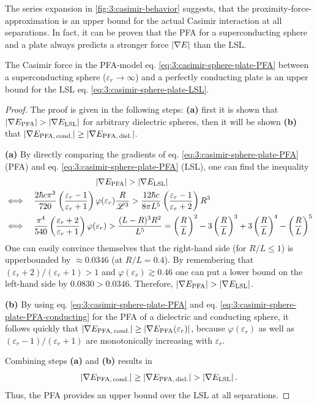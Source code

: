 The series expansion in \cref{fig:3:casimir-behavior} suggests, that the proximity-force-approximation is an upper bound for the actual Casimir interaction at all separations. In fact, it can be proven that the PFA for a superconducting sphere and a plate always predicts a stronger force $\left\lvert\nabla E\right\rvert$ than the LSL.
\begin{theorem}
  The Casimir force in the PFA-model eq. \eqref{eq:3:casimir-sphere-plate-PFA} between a superconducting sphere ($\varepsilon_r \rightarrow \infty$) and a perfectly conducting plate is an upper bound for the LSL eq. \eqref{eq:3:casimir-sphere-plate-LSL}.
\end{theorem}
\begin{proof}
  The proof is given in the following steps: \textbf{(a)} first it is shown that $\left\lvert\nabla E_\mathrm{PFA}\right\rvert > \left\lvert\nabla E_\mathrm{LSL}\right\rvert$ for arbitrary dielectric spheres, then it will be shown \textbf{(b)} that $\left\lvert\nabla E_\mathrm{PFA,\,cond.}\right\rvert \geq \left\lvert\nabla E_\mathrm{PFA,\,diel.}\right\rvert$.

  \textbf{(a)} By directly comparing the gradients of eq. \eqref{eq:3:casimir-sphere-plate-PFA} (PFA) and eq. \eqref{eq:3:casimir-sphere-plate-PFA} (LSL),  one can find
  the inequality
  \begin{align*}
    &\qquad\qquad\qquad\qquad\qquad\ \ \left\lvert\nabla E_\mathrm{PFA}\right\rvert > \left\lvert\nabla E_\mathrm{LSL}\right\rvert \\
    &\Longleftrightarrow \quad  \frac{2\hbar c \pi^3}{720}\left(\frac{\varepsilon_r - 1}{\varepsilon_r + 1}\right)\varphi(\varepsilon_r)\frac{R}{\mathscr{L}^3} > \frac{12 \hbar c}{8\pi L^5}\left(\frac{\varepsilon_r - 1}{\varepsilon_r + 2}\right)R^3 \\
    &\Longleftrightarrow \quad \frac{\pi^4}{540}\left(\frac{\varepsilon_r + 2}{\varepsilon_r + 1}\right)\varphi(\varepsilon_r) > \frac{(L-R)^3 R^2}{L^5} = \left(\frac{R}{L}\right)^2 - 3\left(\frac{R}{L}\right)^3 + 3\left(\frac{R}{L}\right)^4 - \left(\frac{R}{L}\right)^5
  \end{align*}
  One can easily convince themselves that the right-hand side (for $R/L \leq 1$) is upperbounded by $\approx 0.0346$ (at $R/L = 0.4$). By remembering that $(\varepsilon_r + 2)/(\varepsilon_r + 1) > 1$ and $\varphi(\varepsilon_r) \gtrsim 0.46$ one can put a lower bound on the left-hand side by $0.0830 > 0.0346$. Therefore, $\left\lvert\nabla E_\mathrm{PFA}\right\rvert > \left\lvert\nabla E_\mathrm{LSL}\right\rvert$.

  \textbf{(b)} By using eq. \eqref{eq:3:casimir-sphere-plate-PFA} and eq. \eqref{eq:3:casimir-sphere-plate-PFA-conducting} for the PFA of a dielectric and conducting sphere, it follows quickly that $\left\lvert\nabla E_\mathrm{PFA,\,cond.}\right\rvert \geq \left\lvert\nabla E_\mathrm{PFA}(\varepsilon_r)\right\rvert$, because $\varphi(\varepsilon_r)$ as well as $(\varepsilon_r - 1)/(\varepsilon_r + 1)$ are monotonically increasing with $\varepsilon_r$. 

  Combining steps \textbf{(a)} and \textbf{(b)} results in
  \begin{equation}
    \left\lvert\nabla E_\mathrm{PFA,\,cond.}\right\rvert \geq \left\lvert\nabla E_\mathrm{PFA,\,diel.}\right\rvert > \left\lvert\nabla E_\mathrm{LSL}\right\rvert .
  \end{equation}
  Thus, the PFA provides an upper bound over the LSL at all separations.
\end{proof}
